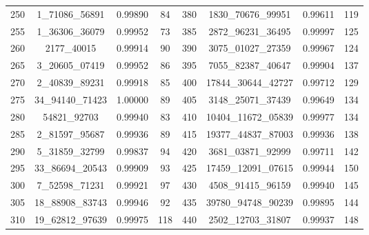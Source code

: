 \documentclass[preprint]{sigplanconf}
\begin{document}
\begin{table}
\begin{center}
\begin{tabular}{|c c c c| c c c c|}
            250             & 1\_71086\_56891  & 0.99890          & 84              & 380          & 1830\_70676\_99951  & 0.99611          & 119             \\
            255             & 1\_36306\_36079  & 0.99952          & 73              & 385          & 2872\_96231\_36495  & 0.99997          & 125             \\
            260             & 2177\_40015      & 0.99914          & 90              & 390          & 3075\_01027\_27359  & 0.99967          & 124             \\
            265             & 3\_20605\_07419  & 0.99952          & 86              & 395          & 7055\_82387\_40647  & 0.99904          & 137             \\
            270             & 2\_40839\_89231  & 0.99918          & 85              & 400          & 17844\_30644\_42727 & 0.99712          & 129             \\
            275             & 34\_94140\_71423 & 1.00000          & 89              & 405          & 3148\_25071\_37439  & 0.99649          & 134             \\
            280             & 54821\_92703     & 0.99940          & 83              & 410          & 10404\_11672\_05839 & 0.99977          & 134             \\
            285             & 2\_81597\_95687  & 0.99936          & 89              & 415          & 19377\_44837\_87003 & 0.99936          & 138             \\
            290             & 5\_31859\_32799  & 0.99837          & 94              & 420          & 3681\_03871\_92999  & 0.99711          & 142             \\
            295             & 33\_86694\_20543 & 0.99909          & 93              & 425          & 17459\_12091\_07615 & 0.99944          & 150             \\
            300             & 7\_52598\_71231  & 0.99921          & 97              & 430          & 4508\_91415\_96159  & 0.99940          & 145             \\
            305             & 18\_88908\_83743 & 0.99946          & 92              & 435          & 39780\_94748\_90239 & 0.99895          & 144             \\
            310             & 19\_62812\_97639 & 0.99975          & 118             & 440          & 2502\_12703\_31807  & 0.99937          & 148             \\

\end{tabular}
\end{center}
\end{table}
\end{document}
